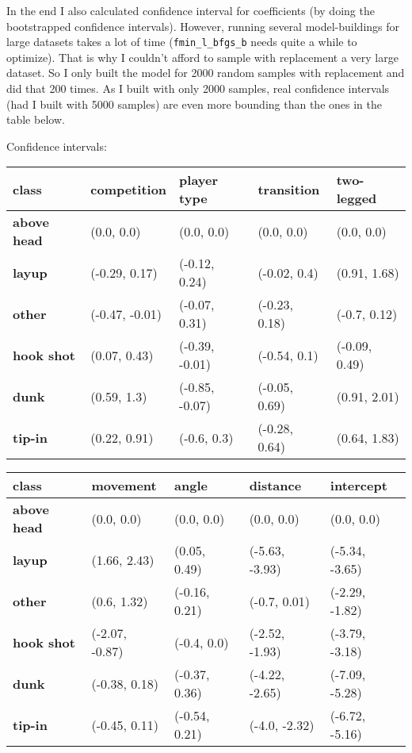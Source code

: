 \documentclass{article}
\begin{document}
In the end I also calculated confidence interval for coefficients (by doing the bootstrapped confidence intervals). However, running several model-buildings for large datasets takes a lot of time (\texttt{fmin\_l\_bfgs\_b} needs quite a while to optimize). That is why I couldn't afford to sample with replacement a very large dataset. So I only built the model for 2000 random samples with replacement and did that 200 times. As I built with only 2000 samples, real confidence intervals (had I built with 5000 samples) are even more bounding than the ones in the table below.

Confidence intervals:

\begin{table}[!ht]
\centering
\begin{tabular}{|l|l|l|l|l|}
\hline
class & competition & player type & transition & two-legged \\ \hline
\textbf{above head} & (0.0, 0.0) & (0.0, 0.0) & (0.0, 0.0) & (0.0, 0.0) \\ \hline
\textbf{layup} & (-0.29, 0.17) & (-0.12, 0.24) & (-0.02, 0.4) & (0.91, 1.68) \\ \hline
\textbf{other} & (-0.47, -0.01) & (-0.07, 0.31) & (-0.23, 0.18) & (-0.7, 0.12) \\ \hline
\textbf{hook shot} & (0.07, 0.43) & (-0.39, -0.01) & (-0.54, 0.1) & (-0.09, 0.49) \\ \hline
\textbf{dunk} & (0.59, 1.3) & (-0.85, -0.07) & (-0.05, 0.69) & (0.91, 2.01) \\ \hline
\textbf{tip-in} & (0.22, 0.91) & (-0.6, 0.3) & (-0.28, 0.64) & (0.64, 1.83) \\ \hline
\end{tabular}
\end{table}

\begin{table}[!ht]
\centering
\begin{tabular}{|l|l|l|l|l|}
\hline
class & movement & angle & distance & intercept \\ \hline
\textbf{above head} & (0.0, 0.0) & (0.0, 0.0) & (0.0, 0.0) & (0.0, 0.0) \\ \hline
\textbf{layup} & (1.66, 2.43) & (0.05, 0.49) & (-5.63, -3.93) & (-5.34, -3.65) \\ \hline
\textbf{other} & (0.6, 1.32) & (-0.16, 0.21) & (-0.7, 0.01) & (-2.29, -1.82) \\ \hline
\textbf{hook shot} & (-2.07, -0.87) & (-0.4, 0.0) & (-2.52, -1.93) & (-3.79, -3.18) \\ \hline
\textbf{dunk} & (-0.38, 0.18) & (-0.37, 0.36) & (-4.22, -2.65) & (-7.09, -5.28) \\ \hline
\textbf{tip-in} & (-0.45, 0.11) & (-0.54, 0.21) & (-4.0, -2.32) & (-6.72, -5.16) \\ \hline
\end{tabular}
\end{table}
\end{document}
